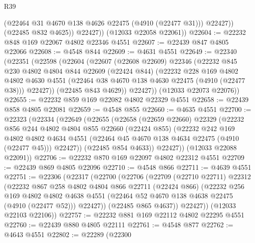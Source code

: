 \begin{lexlean}{R39}
\begin{coremodule}
                (@22464 @31 @4670 @138 @4626 @22475 (@4910 (@22477 @31)))
                @22427))
            (@22485 @832 @4625))
          @22427))
      (@12033 @22058 @22061))
@22604 := @22232 @848 @169 @22067 @4802 @22346 @4551
@22607 := @22439 @847 @4805 @22066
@22608 := @4548 @844
@22609 := @4631 @4551
@22649 := @22340
    (@22351
      (@22598
        (@22604
          (@22607
            (@22608 @22609)
            @22346
            (@22232
              @845
              @230
              @4802
              @4804
              @844
              @22609
              (@22424 @844)
              (@22232
                @228
                @169
                @4802
                @4802
                @4630
                @4551
                (@22464 @38 @4670 @138 @4630 @22475 (@4910 (@22477 @38)))
                @22427))
            (@22485 @843 @4629))
          @22427))
      (@12033 @22073 @22076))
@22655 := @22232 @859 @169 @22082 @4802 @22329 @4551
@22658 := @22439 @858 @4805 @22081
@22659 := @4548 @855
@22660 := @4635 @4551
@22700 := @22323
    (@22334
      (@22649
        (@22655
          (@22658
            (@22659 @22660)
            @22329
            (@22232
              @856
              @244
              @4802
              @4804
              @855
              @22660
              (@22424 @855)
              (@22232
                @242
                @169
                @4802
                @4802
                @4634
                @4551
                (@22464 @45 @4670 @138 @4634 @22475 (@4910 (@22477 @45)))
                @22427))
            (@22485 @854 @4633))
          @22427))
      (@12033 @22088 @22091))
@22706 := @22232 @870 @169 @22097 @4802 @22312 @4551
@22709 := @22439 @869 @4805 @22096
@22710 := @4548 @866
@22711 := @4639 @4551
@22751 := @22306
    (@22317
      (@22700
        (@22706
          (@22709
            (@22710 @22711)
            @22312
            (@22232
              @867
              @258
              @4802
              @4804
              @866
              @22711
              (@22424 @866)
              (@22232
                @256
                @169
                @4802
                @4802
                @4638
                @4551
                (@22464 @52 @4670 @138 @4638 @22475 (@4910 (@22477 @52)))
                @22427))
            (@22485 @865 @4637))
          @22427))
      (@12033 @22103 @22106))
@22757 := @22232 @881 @169 @22112 @4802 @22295 @4551
@22760 := @22439 @880 @4805 @22111
@22761 := @4548 @877
@22762 := @4643 @4551
@22802 := @22289
    (@22300

\end{coremodule}
\end{lexlean}
